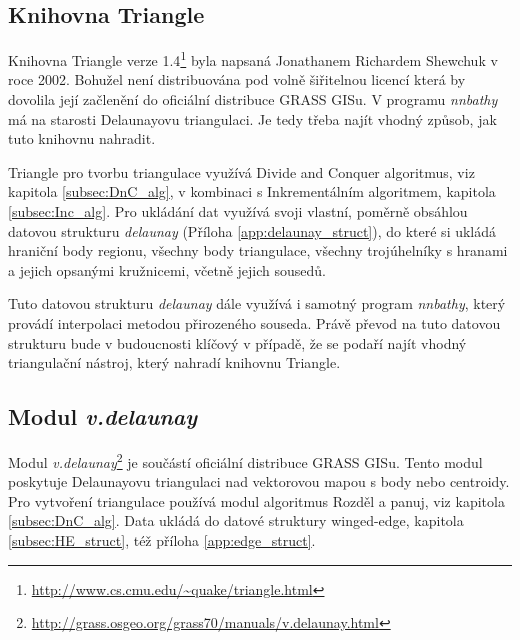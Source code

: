 \documentclass[12pt,a4paper]{article}
\begin{document}
\newpage
\subsection{Knihovna Triangle}

Knihovna Triangle verze
1.4\footnote{\url{http://www.cs.cmu.edu/~quake/triangle.html}} byla napsaná
Jonathanem Richardem Shewchuk v roce 2002. Bohužel není distribuována pod
volně šiřitelnou licencí která by dovolila její začlenění do oficiální distribuce GRASS
GISu. V programu \emph{nnbathy} má na starosti Delaunayovu
triangulaci. Je tedy třeba najít vhodný způsob, jak tuto knihovnu
nahradit.

Triangle pro tvorbu triangulace využívá Divide and Conquer algoritmus,
viz kapitola \ref{subsec:DnC_alg}, v kombinaci s Inkrementálním
algoritmem, kapitola \ref{subsec:Inc_alg}. Pro ukládání dat využívá
svoji vlastní, poměrně obsáhlou datovou strukturu \emph{delaunay}
(Příloha \ref{app:delaunay_struct}), do které si ukládá hraniční body
regionu, všechny body triangulace, všechny trojúhelníky s hranami a
jejich opsanými kružnicemi, včetně jejich sousedů.

Tuto datovou strukturu \emph{delaunay} dále využívá i samotný program
\emph{nnbathy}, který provádí interpolaci metodou přirozeného
souseda. Právě převod na tuto datovou strukturu bude v budoucnosti
klíčový v případě, že se podaří najít vhodný triangulační nástroj,
který nahradí knihovnu Triangle.

\newpage
\subsection{Modul \emph{v.delaunay}}
\label{subsec:v.delaunay}

Modul
\emph{v.delaunay}\footnote{\url{http://grass.osgeo.org/grass70/manuals/v.delaunay.html}}
je součástí oficiální distribuce GRASS GISu. Tento modul poskytuje
Delaunayovu triangulaci nad vektorovou mapou s body nebo
centroidy. Pro vytvoření triangulace používá modul algoritmus Rozděl a
panuj, viz kapitola \ref{subsec:DnC_alg}. Data ukládá do datové
struktury winged-edge, kapitola \ref{subsec:HE_struct}, též příloha \ref{app:edge_struct}.
\end{document}
